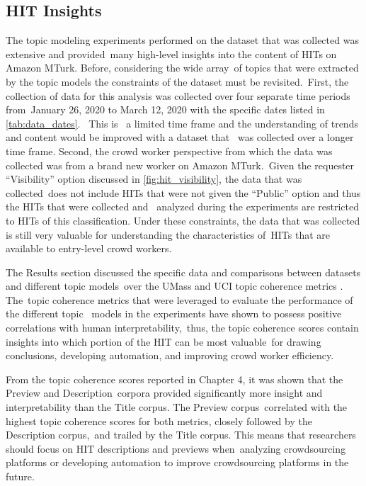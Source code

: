 \documentclass[letterpaper,12pt]{article}
\begin{document}
\subsection{HIT Insights}
The topic modeling experiments performed on the dataset that was collected was extensive and provided\
many high-level insights into the content of HITs on Amazon MTurk. Before, considering the wide array\
of topics that were extracted by the topic models the constraints of the dataset must be revisited.\
First, the collection of data for this analysis was collected over four separate time periods from\
January 26, 2020 to March 12, 2020 with the specific dates listed in \ref{tab:data_dates}. \ This is \
a limited time frame and the understanding of trends and content would be improved with a dataset that \
was collected over a longer time frame.
Second, the crowd worker perspective from which the data was collected was from a brand new worker on Amazon MTurk.\
Given the requester ``Visibility'' option discussed in \ref{fig:hit_visibility}, the data that was collected\
does not include HITs that were not given the ``Public'' option and thus the HITs that were collected and \
analyzed during the experiments are restricted to HITs of this classification.
Under these constraints, the data that was collected is still very valuable for understanding the characteristics of\
HITs that are available to entry-level crowd workers.

The Results section discussed the specific data and comparisons between datasets and different topic models\
over the UMass and UCI topic coherence metrics \cite{mimno2011optimizing,newman2010automatic}. The\
topic coherence metrics that were leveraged to evaluate the performance of the different topic \
models in the experiments have shown to possess positive correlations with human interpretability,\
thus, the topic coherence scores contain insights into which portion of the HIT can be most valuable\
for drawing conclusions, developing automation, and improving crowd worker efficiency. 

From the topic coherence scores reported in Chapter 4, it was shown that the Preview and Description\
corpora provided significantly more insight and interpretability than the Title corpus. The Preview corpus\
correlated with the highest topic coherence scores for both metrics, closely followed by the Description corpus,\
and trailed by the Title corpus. This means that researchers should focus on HIT descriptions and previews when\
analyzing crowdsourcing platforms or developing automation to improve crowdsourcing platforms in the future.\
\end{document}
